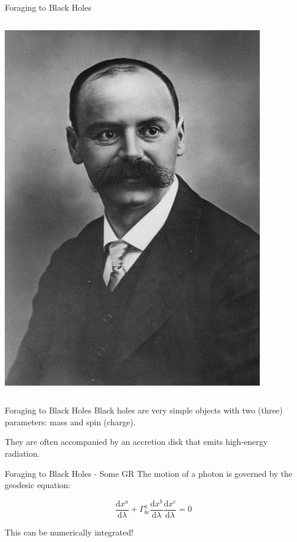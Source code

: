 \documentclass{beamer}
\begin{document}
\begin{frame}{Foraging to Black Holes}
\begin{columns}
        \includegraphics[width=\textwidth]{asset/schwarzschild.jpg}
    \end{columns}

\end{frame}


\begin{frame}{Foraging to Black Holes}
    Black holes are very simple objects with two (three) parameters: mass and spin (charge).

    \vspace{0.5cm}

    They are often accompanied by an accretion disk that emits high-energy radiation.
\end{frame}


\begin{frame}{Foraging to Black Holes - Some GR}
    The motion of a photon is governed by the geodesic equation:

    \vspace{0.5cm}

    \begin{equation*}
        \frac{\mathrm{d}x^{a}}{\mathrm{d}\lambda} + \Gamma^{a}_{bc} \frac{\mathrm{d}x^{b}}{\mathrm{d}\lambda} \frac{\mathrm{d}x^{c}}{\mathrm{d}\lambda} = 0
    \end{equation*}

    \vspace{0.5cm}

    This can be numerically integrated!
\end{frame}
\end{document}
